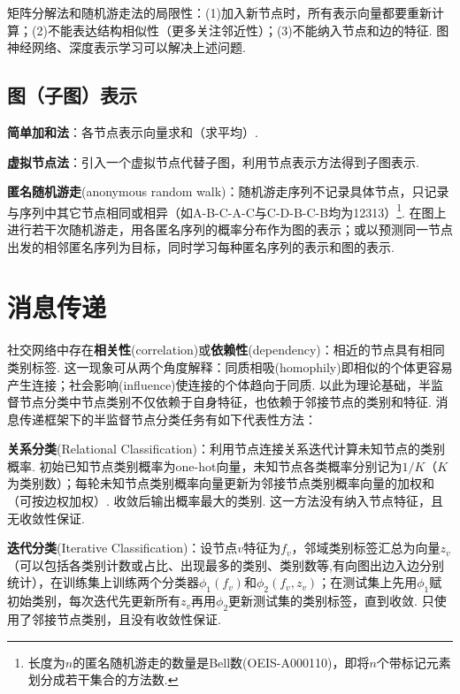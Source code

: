 \par 矩阵分解法和随机游走法的局限性：(1)加入新节点时，所有表示向量都要重新计算；(2)不能表达结构相似性（更多关注邻近性）；(3)不能纳入节点和边的特征. 图神经网络、深度表示学习可以解决上述问题. 

\subsection{图（子图）表示}
\par \textbf{简单加和法}：各节点表示向量求和（求平均）. 
\par \textbf{虚拟节点法}：引入一个虚拟节点代替子图，利用节点表示方法得到子图表示. 
\par \textbf{匿名随机游走}(anonymous random walk)：随机游走序列不记录具体节点，只记录与序列中其它节点相同或相异（如A-B-C-A-C与C-D-B-C-B均为12313）\footnote{长度为$n$的匿名随机游走的数量是Bell数(OEIS-A000110)，即将$n$个带标记元素划分成若干集合的方法数. }. 在图上进行若干次随机游走，用各匿名序列的概率分布作为图的表示；或以预测同一节点出发的相邻匿名序列为目标，同时学习每种匿名序列的表示和图的表示. 

\section{消息传递}
\par 社交网络中存在\textbf{相关性}(correlation)或\textbf{依赖性}(dependency)：相近的节点具有相同类别标签. 这一现象可从两个角度解释：同质相吸(homophily)即相似的个体更容易产生连接；社会影响(influence)使连接的个体趋向于同质. 以此为理论基础，半监督节点分类中节点类别不仅依赖于自身特征，也依赖于邻接节点的类别和特征. 消息传递框架下的半监督节点分类任务有如下代表性方法：

\par \textbf{关系分类}(Relational Classification)：利用节点连接关系迭代计算未知节点的类别概率. 初始已知节点类别概率为one-hot向量，未知节点各类概率分别记为$1/K$（$K$为类别数）；每轮未知节点类别概率向量更新为邻接节点类别概率向量的加权和（可按边权加权）. 收敛后输出概率最大的类别. 这一方法没有纳入节点特征，且无收敛性保证. 

\par \textbf{迭代分类}(Iterative Classification)：设节点$v$特征为$f_v$，邻域类别标签汇总为向量$z_v$（可以包括各类别计数或占比、出现最多的类别、类别数等,有向图出边入边分别统计），在训练集上训练两个分类器$\phi_1(f_v)$和$\phi_2(f_v,z_v)$；在测试集上先用$\phi_1$赋初始类别，每次迭代先更新所有$z_v$再用$\phi_2$更新测试集的类别标签，直到收敛. 只使用了邻接节点类别，且没有收敛性保证. 

